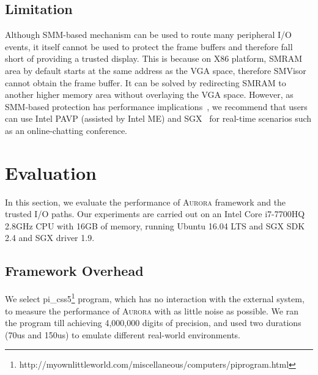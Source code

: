 %

\subsection{Limitation}
Although  SMM-based mechanism can be used to route many peripheral I/O events, it itself cannot be used to protect the frame buffers and therefore fall short of providing a trusted display. This is because on X86 platform, SMRAM area by default starts at the same address as the VGA space, therefore SMVisor cannot obtain the frame buffer. It can be solved by redirecting  SMRAM to another higher memory area without overlaying the VGA space. However, as  SMM-based protection has performance implications~\cite{DBLP:conf/iiswc/DelgadoK13}, we recommend that users can use Intel PAVP (assisted by Intel ME) and SGX~\cite{DBLP:conf/isca/HoekstraLPPC13} for real-time scenarios such as an online-chatting conference.


\section{Evaluation}\label{performance}

In this section, we evaluate the performance of \textsc{Aurora} framework and the trusted I/O paths. Our experiments are carried out on  an Intel Core i7-7700HQ 2.8GHz CPU with 16GB of memory, running Ubuntu 16.04 LTS and SGX SDK 2.4 and SGX driver 1.9.

\subsection{Framework Overhead}
We select  pi\_css5\footnote{http://myownlittleworld.com/miscellaneous/computers/piprogram.html} program, which has no interaction with the external system, to measure the performance of \textsc{Aurora} with as little noise as possible. We ran the program till achieving 4,000,000 digits of precision, and used two durations (70us and 150us) to emulate different real-world environments.

